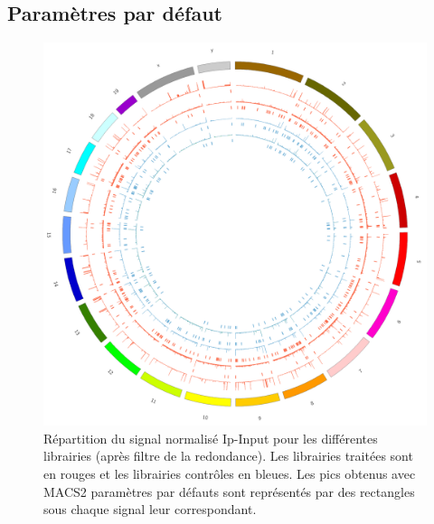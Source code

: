 \documentclass[a4paper,12pt,times]{report}
\newcommand{\scaption}[1]{\caption{\footnotesize{#1}}}
\begin{document}
\begin{appendices}
\subsection{Paramètres par défaut}
\begin{figure}[!h]
\centering
\includegraphics [scale=0.2]{circosMacs.png}
\scaption{Répartition du signal normalisé Ip-Input pour les différentes librairies (après filtre de la redondance).  Les librairies traitées sont en rouges et les librairies contrôles en bleues.
Les pics obtenus avec MACS2 paramètres par défauts sont représentés par des rectangles sous chaque signal leur correspondant.
}
\label{MACS2D}
\end{figure}

\newpage

\end{appendices}
\end{document}
